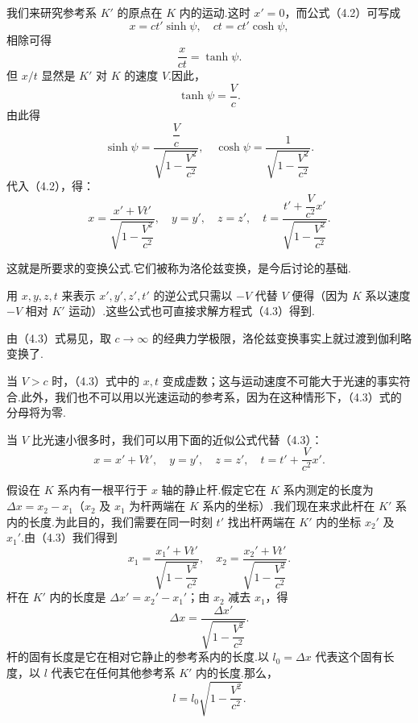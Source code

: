 我们来研究参考系 $K'$ 的原点在 $K$ 内的运动.这时 $x'=0$，而公式（4.2）可写成
\begin{equation*}
  x=ct'\sinh\psi,\quad ct=ct'\cosh\psi,
\end{equation*}
相除可得
\begin{equation*}
  \frac{x}{ct}=\tanh\psi.
\end{equation*}
但 $x/t$ 显然是 $K'$ 对 $K$ 的速度 $V$.因此，
\begin{equation*}
  \tanh\psi=\frac{V}{c}.
\end{equation*}
由此得
\begin{equation*}
  \sinh\psi=\frac{\dfrac{V}{c}}{\sqrt{1-\dfrac{V^2}{c^2}}},\quad
  \cosh\psi=\frac{1}{\sqrt{1-\dfrac{V^2}{c^2}}}.
\end{equation*}
代入（4.2），得：
\begin{equation}
  x=\frac{x'+Vt'}{\sqrt{1-\dfrac{V^2}{c^2}}},\quad
  y=y',\quad z=z',\quad
  t=\frac{t'+\dfrac{V}{c^2}x'}{\sqrt{1-\dfrac{V^2}{c^2}}}.
\end{equation}

这就是所要求的变换公式.它们被称为洛伦兹变换，是今后讨论的基础.

用 $x,y,z,t$ 来表示 $x',y',z',t'$ 的逆公式只需以 $-V$ 代替 $V$ 便得（因为 $K$ 系以速度 $-V$ 相对 $K'$ 运动）.这些公式也可直接求解方程式（4.3）得到.

由（4.3）式易见，取 $c\to\infty$ 的经典力学极限，洛伦兹变换事实上就过渡到伽利略变换了.

当 $V>c$ 时，（4.3）式中的 $x,t$ 变成虚数；这与运动速度不可能大于光速的事实符合.此外，我们也不可以用以光速运动的参考系，因为在这种情形下，（4.3）式的分母将为零.

当 $V$ 比光速小很多时，我们可以用下面的近似公式代替（4.3）：
\begin{equation}
  x=x'+Vt',\quad y=y',\quad z=z',\quad t=t'+\frac{V}{c^2}x'.
\end{equation}

假设在 $K$ 系内有一根平行于 $x$ 轴的静止杆.假定它在 $K$ 系内测定的长度为 $\Delta x=x_2-x_1$（$x_2$ 及 $x_1$ 为杆两端在 $K$ 系内的坐标）.我们现在来求此杆在 $K'$ 系内的长度.为此目的，我们需要在同一时刻 $t'$ 找出杆两端在 $K'$ 内的坐标 $x_2'$ 及 $x_1'$.由（4.3）我们得到
\begin{equation*}
  x_1=\frac{x_1'+Vt'}{\sqrt{1-\dfrac{V^2}{c^2}}},\quad
  x_2=\frac{x_2'+Vt'}{\sqrt{1-\dfrac{V^2}{c^2}}}.
\end{equation*}
杆在 $K'$ 内的长度是 $\Delta x'=x_2'-x_1'$；由 $x_2$ 减去 $x_1$，得
\begin{equation*}
  \Delta x=\frac{\Delta x'}{\sqrt{1-\dfrac{V^2}{c^2}}}.
\end{equation*}
杆的固有长度是它在相对它静止的参考系内的长度.以 $l_0=\Delta x$ 代表这个固有长度，以 $l$ 代表它在任何其他参考系 $K'$ 内的长度.那么，
\begin{equation}
  l=l_0\sqrt{1-\frac{V^2}{c^2}}.
\end{equation}


